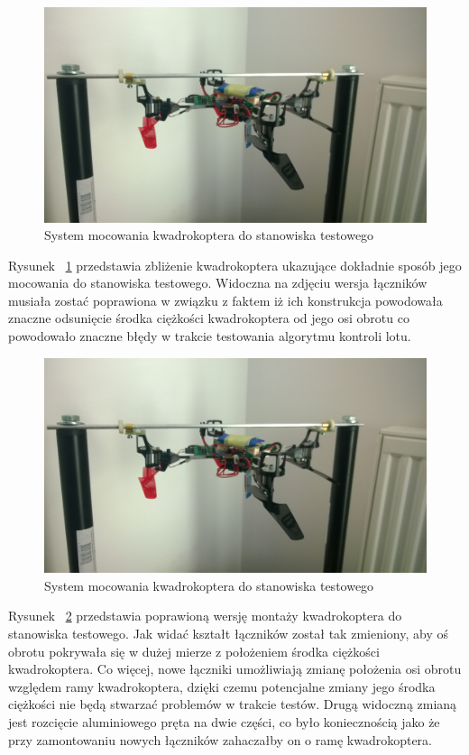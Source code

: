 \begin{figure}[H]
	\centering
	\includegraphics[scale=0.12]{Pictures/QuadroTestStationZoom.jpg}
	\caption[System mocowania kwadrokoptera do stanowiska testowego]{System mocowania kwadrokoptera do stanowiska testowego}
	\label{fig:QuadroTestStationZoom}
\end{figure}

Rysunek ~\ref{fig:QuadroTestStationZoom} przedstawia zbliżenie kwadrokoptera ukazujące dokładnie sposób jego mocowania do stanowiska testowego. Widoczna na zdjęciu wersja łączników musiała zostać poprawiona w związku z faktem iż ich konstrukcja powodowała znaczne odsunięcie środka ciężkości kwadrokoptera od jego osi obrotu co powodowało znaczne błędy w trakcie testowania algorytmu kontroli lotu. 

\begin{figure}[H]
	\centering
	\includegraphics[scale=0.12]{Pictures/QuadroTestStationZoom.jpg}
	\caption[System mocowania kwadrokoptera do stanowiska testowego]{System mocowania kwadrokoptera do stanowiska testowego}
	\label{fig:QuadroTestStationZoom2}
\end{figure}

Rysunek ~\ref{fig:QuadroTestStationZoom2} przedstawia poprawioną wersję montaży kwadrokoptera do stanowiska testowego. Jak widać kształt łączników został tak zmieniony, aby oś obrotu pokrywała się w dużej mierze z położeniem środka ciężkości kwadrokoptera. Co więcej, nowe łączniki umożliwiają zmianę położenia osi obrotu względem ramy kwadrokoptera, dzięki czemu potencjalne zmiany jego środka ciężkości nie będą stwarzać problemów w trakcie testów. Drugą widoczną zmianą jest rozcięcie aluminiowego pręta na dwie części, co było koniecznością jako że przy zamontowaniu nowych łączników zahaczałby on o ramę kwadrokoptera. 
